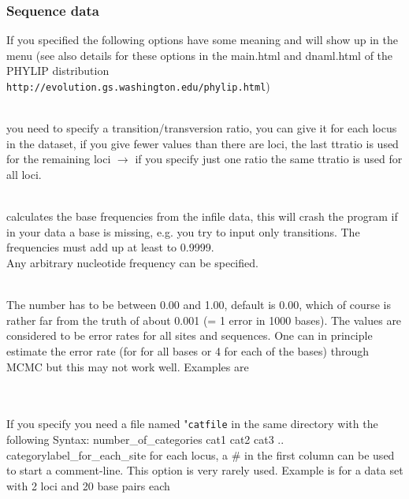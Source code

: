 \subsubsection{Sequence data}
If you specified {} the following options have some meaning and will show up in the menu (see also details for these options in the main.html and dnaml.html of the PHYLIP distribution\\
{\tt http://evolution.gs.washington.edu/phylip.html})
\begin{description}
\item{}\\ you need to specify a
transition/transversion ratio, you can give it for each locus in the
dataset, if you give fewer values than there are loci, the last
ttratio is used for the remaining loci $\rightarrow$ if you specify
just one ratio the same ttratio is used for all loci.
\item{}\\
{}
 calculates the base frequencies from the infile data, this will
 crash the program if in your data a base is missing, e.g. you try
 to input only transitions. The frequencies must add up at least to 0.9999.\\
{}
Any arbitrary nucleotide frequency can be specified.
\item{\\ 
The number has to be between 0.00 and
1.00, default is 0.00, which of course is rather far from the truth of
about 0.001 (= 1 error in 1000 bases). The values are considered to be error rates for all sites and sequences. One can in principle estimate the error rate (for for all bases or 4 for each of the bases) through MCMC but this may not work well. Examples are\\
\\
}
\item{}\\
 If you specify {} you need a file named "{\tt catfile} in the same  directory
 with the following Syntax:
 number\_of\_categories cat1 cat2 cat3 .. categorylabel\_for\_each\_site
 for each locus, a \#  in the first column can be used to start a comment-line. This option is very rarely used. 
 Example is for a data set with 2 loci and 20 base pairs each

\end{description}

